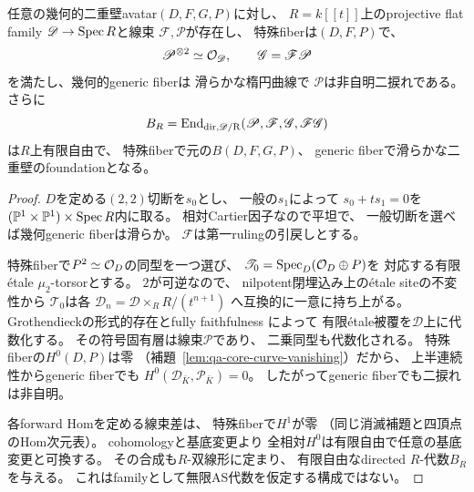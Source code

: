 \begin{lemma}
\label{lem:qa-as-cubic-two-torsion-smoothing}
任意の幾何的二重壁avatar$(D,F,G,P)$に対し、
$R=k[[t]]$上のprojective flat family
$\mathscr D\to\operatorname{Spec} R$と線束
$\mathscr F,\mathscr P$が存在し、
特殊fiberは$(D,F,P)$で、
\[
\mathscr P^{\otimes2}\simeq\mathcal O_{\mathscr D},
\qquad
\mathscr G=\mathscr F\mathscr P
\]
を満たし、幾何的generic fiberは
滑らかな楕円曲線で
$\mathscr P$は非自明二捩れである。
さらに
\[
 B_R=\operatorname{End}_{\mathrm{dir,\mathscr D/R}}
 (\mathscr P,\mathscr F,\mathscr G,\mathscr F\mathscr G)
\]
は$R$上有限自由で、
特殊fiberで元の$B(D,F,G,P)$、
generic fiberで滑らかな二重壁のfoundationとなる。
\end{lemma}
\begin{proof}
$D$を定める$(2,2)$切断を$s_0$とし、
一般の$s_1$によって
$s_0+ts_1=0$を
$(\mathbb P^1\times\mathbb P^1)\times\operatorname{Spec} R$内に取る。
相対Cartier因子なので平坦で、
一般切断を選べば幾何generic fiberは滑らか。
$\mathscr F$は第一rulingの引戻しとする。

特殊fiberで$P^2\simeq\mathcal O_D$の同型を一つ選び、
$\mathscr T_0=\operatorname{Spec}_D(\mathcal O_D\oplus P)$を
対応する有限étale $\mu_2$-torsorとする。
$2$が可逆なので、
nilpotent閉埋込み上のétale siteの不変性から
$\mathscr T_0$は各
$\mathscr D_n=\mathscr D\times_RR/(t^{n+1})$
へ互換的に一意に持ち上がる。
Grothendieckの形式的存在とfully faithfulness
\cite[Tags 0BQB, 087V]{StacksModuli}によって
有限étale被覆を$\mathscr D$上に代数化する。
その符号固有層は線束$\mathscr P$であり、
二乗同型も代数化される。
特殊fiberの$H^0(D,P)$は零
（補題~\ref{lem:qa-core-curve-vanishing}）だから、
上半連続性からgeneric fiberでも
$H^0(\mathscr D_{\bar K},\mathscr P_{\bar K})=0$。
したがってgeneric fiberでも二捩れは非自明。

各forward Homを定める線束差は、
特殊fiberで$H^1$が零
（同じ消滅補題と四頂点のHom次元表）。
cohomologyと基底変更より
全相対$H^0$は有限自由で任意の基底変更と可換する。
その合成も$R$-双線形に定まり、
有限自由なdirected $R$-代数$B_R$を与える。
これはfamilyとして無限AS代数を仮定する構成ではない。
\end{proof}

